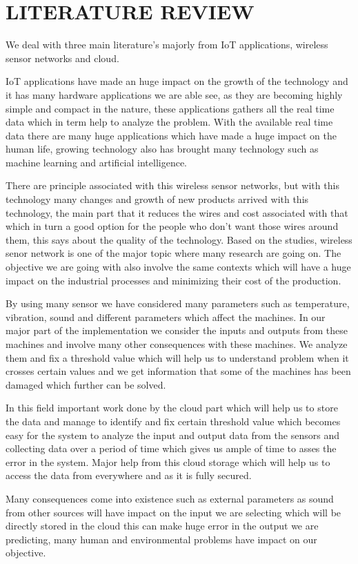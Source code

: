 \section{LITERATURE REVIEW}
We deal with three main literature's majorly from IoT applications, wireless sensor networks and cloud.

IoT applications have made an huge impact on the growth of the technology and it has many hardware applications we are able see, as they are becoming highly simple and compact in the nature, these applications gathers all the real time data which in term help to analyze the problem. With the available real time data there are many huge applications which have made a huge impact on the human life, growing technology also has brought many technology such as machine learning and artificial intelligence.

 There are principle associated with this wireless sensor networks, but with this technology many changes and growth of new products arrived with this technology, the main part that it reduces the wires and cost associated with that which in turn a good option for the people who don't want those wires around them, this says about the quality of the technology. Based on the studies, wireless senor network is one of the major topic where many research are going on.
The objective we are going with also involve the same contexts which will have a huge impact on the industrial processes and minimizing their cost of the production. 

By using many sensor we have considered many parameters such as temperature, vibration, sound and different parameters which affect the machines. In our major part of the implementation we consider the inputs and outputs from these machines and involve many other consequences with these machines. We analyze them and fix a threshold value which will help us to understand problem when it crosses certain values and we get information that some of the machines has been damaged which further can be solved.

In this field important work done by the cloud part which will help us to store the data and manage to identify and fix certain threshold value which becomes easy for the system to analyze the input and output data from the sensors and collecting data over a period of time which gives us ample of time to asses the error in the system. Major help from this cloud storage which will help us to access the data from everywhere and as it is fully secured.

Many consequences come into existence such as external parameters as sound from other sources will have impact on the input we are selecting  which will be directly stored in the cloud this can make huge error in the output we are predicting, many human and environmental problems have impact on our objective. 

